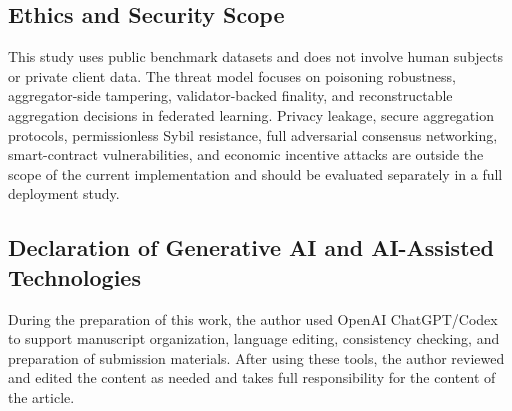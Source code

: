 \documentclass[preprint,12pt]{elsarticle}
\begin{document}
\subsection{Ethics and Security Scope}

This study uses public benchmark datasets and does not involve human subjects or private client data. The threat model focuses on poisoning robustness, aggregator-side tampering, validator-backed finality, and reconstructable aggregation decisions in federated learning. Privacy leakage, secure aggregation protocols, permissionless Sybil resistance, full adversarial consensus networking, smart-contract vulnerabilities, and economic incentive attacks are outside the scope of the current implementation and should be evaluated separately in a full deployment study.

\subsection{Declaration of Generative AI and AI-Assisted Technologies}

During the preparation of this work, the author used OpenAI ChatGPT/Codex to support manuscript organization, language editing, consistency checking, and preparation of submission materials. After using these tools, the author reviewed and edited the content as needed and takes full responsibility for the content of the article.



\end{document}
